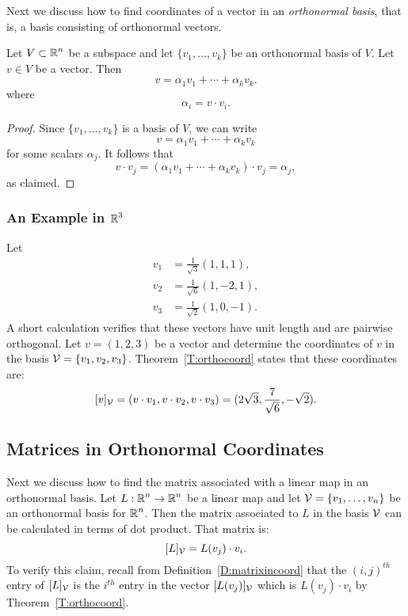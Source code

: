 \documentclass{ximera}
\begin{document}
Next we discuss how to find coordinates of a vector in an
{\em orthonormal basis},
that is, a basis consisting of orthonormal vectors.

\begin{theorem}  \label{T:orthocoord}
Let $V\subset\mbox{$\Bbb{R}$}^n$ be a subspace and
let $\{v_1,\ldots,v_k\}$ be an
orthonormal basis of $V$.  Let $v\in V$ be a vector.   Then
\[
v = \alpha_1v_1 + \cdots + \alpha_kv_k.
\]
where
\[
\alpha_i = v\cdot v_i.
\]
\end{theorem}

\begin{proof}  Since $\{v_1,\ldots,v_k\}$ is a basis of $V$, we can write
\[
v = \alpha_1v_1 + \cdots + \alpha_kv_k
\]
for some scalars $\alpha_j$.  It follows that
\[
v\cdot v_j = (\alpha_1v_1 + \cdots + \alpha_kv_k)\cdot v_j = \alpha_j,
\]
as claimed.   \end{proof}

\subsubsection{An Example in $\mbox{$\Bbb{R}$}^3$}

Let
\begin{align*}
  v_1 &= \frac{1}{\sqrt{3}}(1,1,1), \\
  v_2 &= \frac{1}{\sqrt{6}}(1,-2,1), \\
  v_3 &= \frac{1}{\sqrt{2}}(1,0,-1).
\end{align*}
A short calculation verifies that these vectors have
unit length and are pairwise orthogonal.  Let $v=(1,2,3)$ be a vector
and determine the coordinates of $v$ in the basis ${\cal V}=\{v_1,v_2,v_3\}$.
Theorem~\ref{T:orthocoord} states that these coordinates are:
\[
[v]_{\cal V} = (v\cdot v_1, v\cdot v_2, v\cdot v_3)
= (2\sqrt{3},\frac{7}{\sqrt{6}},-\sqrt{2}).
\]


\subsection*{Matrices in Orthonormal Coordinates}

Next we discuss how to find the matrix associated with a linear map in an
orthonormal basis.  Let $L:\mbox{$\Bbb{R}$}^n\to\mbox{$\Bbb{R}$}^n$ be a linear map and let
${\cal V} = \{v_1,\ldots,v_n\}$ be an orthonormal basis for $\mbox{$\Bbb{R}$}^n$.  Then
the matrix associated to $L$ in the basis ${\cal V}$ can be calculated 
in terms of dot product.  That matrix is:
\begin{equation}  \label{e:coordorthomat}
[L]_{\cal V} = L(v_j)\cdot v_i.
\end{equation}
To verify this claim, recall from Definition~\ref{D:matrixincoord} that 
the $(i,j)^{th}$ entry of $[L]_{\cal V}$ is
the $i^{th}$ entry in the vector $[L(v_j)]_{\cal V}$ which is
$L(v_j)\cdot v_i$ by Theorem~\ref{T:orthocoord}.
\end{document}

